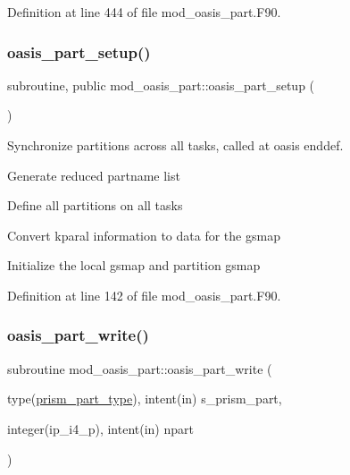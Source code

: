 Definition at line 444 of file mod\+\_\+oasis\+\_\+part.\+F90.

\mbox{\label{namespacemod__oasis__part_a80f66cc0ce5857aa53d070861f05b521}} 
\subsubsection{\texorpdfstring{oasis\+\_\+part\+\_\+setup()}{oasis\_part\_setup()}}
{\footnotesize\ttfamily subroutine, public mod\+\_\+oasis\+\_\+part\+::oasis\+\_\+part\+\_\+setup (\begin{DoxyParamCaption}{ }\end{DoxyParamCaption})}



Synchronize partitions across all tasks, called at oasis enddef. 


\begin{DoxyItemize}
\item Generate reduced partname list
\item Define all partitions on all tasks
\item Convert kparal information to data for the gsmap
\item Initialize the local gsmap and partition gsmap 
\end{DoxyItemize}

Definition at line 142 of file mod\+\_\+oasis\+\_\+part.\+F90.

\mbox{\label{namespacemod__oasis__part_a12edb4b0248a3f562fe5f6e16eede06a}} 
\subsubsection{\texorpdfstring{oasis\+\_\+part\+\_\+write()}{oasis\_part\_write()}}
{\footnotesize\ttfamily subroutine mod\+\_\+oasis\+\_\+part\+::oasis\+\_\+part\+\_\+write (\begin{DoxyParamCaption}\item[{type(\hyperlink{structmod__oasis__part_1_1prism__part__type}{prism\+\_\+part\+\_\+type}), intent(in)}]{s\+\_\+prism\+\_\+part,  }\item[{integer(ip\+\_\+i4\+\_\+p), intent(in)}]{npart }\end{DoxyParamCaption})\hspace{0.3cm}{\ttfamily [private]}}



